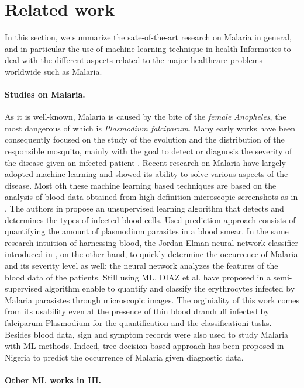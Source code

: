 \section{Related work}\label{related_work}
In this section, we summarize the sate-of-the-art research on Malaria in general, and in particular the
use of machine learning technique in health Informatics to deal with the different aspects related to the 
major healthcare problems worldwide such as Malaria.

\paragraph*{Studies on Malaria.}
As it is well-known, Malaria is caused by the bite of the \emph{female Anopheles}, the most dangerous of which
is \emph{Plasmodium falciparum}. Many early works have been consequently focused on the study of the evolution and
the distribution of the responsible mosquito, mainly with the goal to detect or diagnosis the severity of the 
disease given an infected patient \cite{Fe03,Al09}. Recent research on Malaria have largely adopted machine learning
and showed its ability to solve various aspects of the disease. Most oth these machine learning based techniques are 
based on the analysis of blood data obtained from high-definition microscopic screenshots as in \cite{Ku18}. The authors
in \cite{Ku18} propose an unsupervised learning algorithm that detects and determines the types of infected blood cells.
Used prediction approach consists of quantifying the amount of plasmodium parasites in a blood smear. In the same research intuition
of harnessing blood, the Jordan-Elman neural network classifier introduced in \cite{Ha15}, on the other hand, to quickly determine the occurrence 
of Malaria and its severity level as well: the neural network analyzes the features of the blood data of the patients.  
Still using ML, DIAZ et al. have proposed in \cite{Dia09} a semi-supervised algorithm enable to quantify and classify the 
erythrocytes infected by Malaria parasistes through microscopic images. The orginiality of this work comes from its usability
even at the presence of thin blood drandruff infected by falciparum Plasmodium for the quantification and the classificationi tasks.
Besides blood data, sign and symptom records were also used to study Malaria with ML methods. Indeed, tree decision-based approach
has been proposed in Nigeria \cite{Ug10} to predict the occurrence of Malaria given diagnostic data. 

\paragraph*{Other ML works in HI.}
